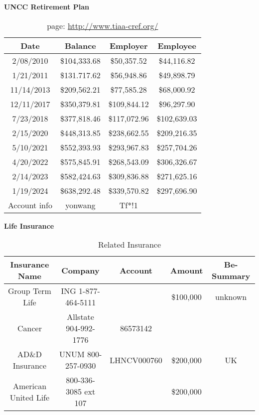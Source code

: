\documentclass[11pt]{article}
\begin{document}
\noindent
{\bf UNCC Retirement Plan}
\begin{table}[htp]
\begin{center}
\begin{tabular}{|c|c|c|c|} \hline
{\bf Date} & Balance & Employer & Employee\\ \hline
2/08/2010&\$104,333.68& \$50,357.52 & \$44,116.82\\ \hline
1/21/2011&\$131.717.62&\$56,948.86 & \$49,898.79\\ \hline
11/14/2013&\$209,562.21&\$77,585.28 & \$68,000.92\\ \hline
12/11/2017&\$350,379.81&\$109,844.12 & \$96,297.90\\ \hline
7/23/2018&\$377,818.46&\$117,072.96& \$102,639.03\\ \hline
2/15/2020&\$448,313.85&\$238,662.55 & \$209,216.35\\ \hline
5/10/2021&\$552,393.93&\$293,967.83 & \$257,704.26\\ \hline
4/20/2022&\$575,845.91&\$268,543.09 & \$306,326.67 \\ \hline
2/14/2023&\$582,424.63 &\$309,836.88 & \$271,625.16\\ \hline
1/19/2024 &\$638,292.48&\$339,570.82 & \$297,696.90\\ \hline
Account info & yonwang &Tf*!1&\\ \hline
\end{tabular}
\caption{page: \url{http://www.tiaa-cref.org/}}
\label{tiaa}
\end{center}
\end{table}


\noindent
{\bf Life Insurance}
\begin{table}[htp]
\begin{center}
\begin{tabular}{|c|c|c|c|c|} \hline
{\bf Insurance Name}&{\bf Company}&{\bf Account}&{\bf Amount}&{\bf Be-Summary}\\ \hline
Group Term Life & ING 1-877-464-5111 && \$100,000 & unknown \\ \hline
Cancer & Allstate 904-992-1776 & 86573142 && \\ \hline
AD\&D Insurance& UNUM 800-257-0930 &LHNCV000760&\$200,000& UK\\ \hline
American United Life& 800-336-3085 ext 107&&\$200,000& \\ \hline
\end{tabular}
\caption{Related Insurance}
\label{insurance}
\end{center}
\end{table}
\end{document}
